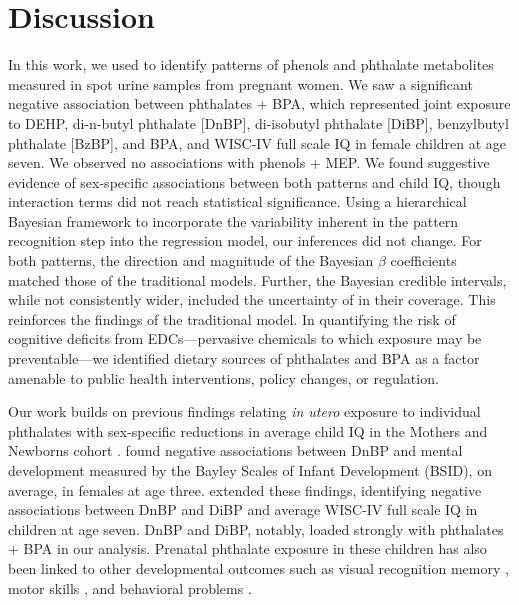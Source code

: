 \section{Discussion}
In this work, we used \bnmf to identify patterns of phenols and phthalate metabolites measured in spot urine samples from pregnant women. We saw a significant negative association between phthalates + BPA, which represented joint exposure to DEHP, di-n-butyl phthalate [DnBP], di-isobutyl phthalate [DiBP], benzylbutyl phthalate [BzBP], and BPA, and WISC-IV full scale IQ in female children at age seven. We observed no associations with phenols + MEP. We found suggestive evidence of sex-specific associations between both patterns and child IQ, though interaction terms did not reach statistical significance. Using a hierarchical Bayesian framework to incorporate the variability inherent in the pattern recognition step into the regression model, our inferences did not change. For both patterns, the direction and magnitude of the Bayesian $\beta$ coefficients matched those of the traditional models. Further, the Bayesian credible intervals, while not consistently wider, included the uncertainty of \bnmf in their coverage. This reinforces the findings of the traditional model. In quantifying the risk of cognitive deficits from EDCs---pervasive chemicals to which exposure may be preventable---we identified dietary sources of phthalates and BPA as a factor amenable to public health interventions, policy changes, or regulation.

Our work builds on previous findings relating \textit{in utero} exposure to individual phthalates with sex-specific reductions in average child IQ in the Mothers and Newborns cohort \cite{factor2014persistent, whyatt2012maternal}. \citet{whyatt2012maternal} found negative associations between DnBP and mental development measured by the Bayley Scales of Infant Development (BSID), on average, in females at age three. \citet{factor2014persistent} extended these findings, identifying negative associations between DnBP and DiBP and average WISC-IV full scale IQ in children at age seven. DnBP and DiBP, notably, loaded strongly with phthalates + BPA in our analysis. Prenatal phthalate exposure in these children has also been linked to other developmental outcomes such as visual recognition memory \cite{ipapo2017maternal}, motor skills \cite{balalian2019prenatal, daniel2020perinatal}, and behavioral problems \cite{daniel2020prenatal}.

